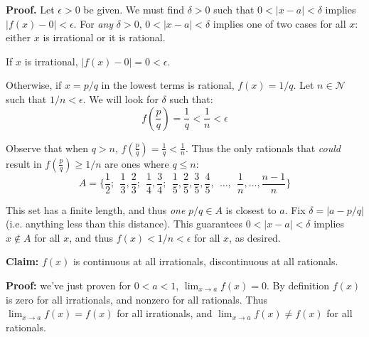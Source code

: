 \vs

\textbf{Proof.} Let $\epsilon>0$ be given. We must find $\delta>0$ such that
$0<|x-a|<\delta$ implies $|f(x)-0|<\epsilon$. For \textit{any}
$\delta>0$, $0<|x-a|<\delta$ implies one of two cases for all $x$: either
$x$ is irrational or it is rational.

\vs

If $x$ is irrational, $|f(x)-0|=0<\epsilon$.

\vs

Otherwise, if $x=p/q$ in the lowest terms is rational, $f(x)=1/q$. Let
$n\in\mathcal{N}$ such that $1/n<\epsilon$. We will look for $\delta$ such that:
\[f\left(\frac{p}{q}\right)=\frac{1}{q}<\frac{1}{n}<\epsilon\]

\vs

Observe that when $q>n$, $f(\frac{p}{q})=\frac{1}{q}<\frac{1}{n}$.
Thus the only rationals that \textit{could} result in $f(\frac{p}{q})\geq1/n$ are
ones where $q\leq n$:
\[A=\{\frac{1}{2};\ \ \frac{1}{3},\frac{2}{3};\ \
  \frac{1}{4},\frac{3}{4};\ \
  \frac{1}{5},\frac{2}{5},\frac{3}{5},\frac{4}{5},\ \ \ldots,\ \ \frac{1}{n},\ldots,\frac{n-1}{n}\}\]

This set has a finite length, and thus \textit{one} $p/q\in A$ is
closest to $a$. Fix $\delta=|a-p/q|$ (i.e. anything less than this
distance). This guarantees $0<|x-a|<\delta$ implies $x\notin A$ for all $x$, and
thus $f(x)<1/n<\epsilon$ for all $x$, as desired.

\vs

\textbf{Claim:} $f(x)$ is continuous at all irrationals, discontinuous
at all rationals.

\vs

\textbf{Proof:} we've just proven for $0<a<1$, $\lim_{x\to a}f(x)=0$. By
definition $f(x)$ is zero for all irrationals, and nonzero for all
rationals. Thus $\lim_{x\to a}f(x)=f(x)$ for all irrationals, and
$\lim_{x\to a}f(x)\neq f(x)$ for all rationals.

